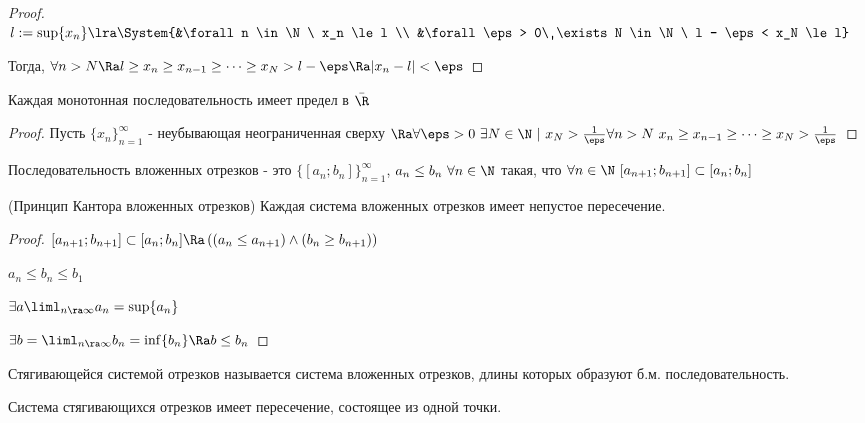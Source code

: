 \begin{proof}
	$l := \sup \{x_n\} \lra \System{&\forall n \in \N\ x_n \le l \\ &\forall \eps > 0\ \exists N \in \N\ l - \eps < x_N \le l}$
	
	Тогда, $\forall n > N \Ra l \ge x_n \ge x_{n - 1} \ge \dots \ge x_N > l - \eps \Ra |x_n - l| < \eps$
\end{proof}

\begin{addition}
	Каждая монотонная последовательность имеет предел в $\bar{\R}$
\end{addition}

\begin{proof}
	Пусть $\{x_n\}_{n = 1}^\infty$ - неубывающая неограниченная сверху $\Ra \forall \eps > 0\ \exists N \in \N\ |\ x_N > \frac{1}{\eps} \forall n > N\ x_n \ge x_{n - 1} \ge \dots \ge x_N > \frac{1}{\eps}$
\end{proof}

\begin{definition}
	Последовательность вложенных отрезков - это $\{[a_n; b_n]\}_{n = 1}^\infty$, $a_n \le b_n\ \forall n \in \N$ такая, что $\forall n \in \N\ [a_{n + 1}; b_{n + 1}] \subset [a_n; b_n]$
\end{definition}

\begin{theorem} (Принцип Кантора вложенных отрезков)
	Каждая система вложенных отрезков имеет непустое пересечение.
\end{theorem}

\begin{proof}
	$[a_{n + 1}; b_{n + 1}] \subset [a_n; b_n] \Ra \left((a_n \le a_{n + 1}) \wedge (b_n \ge b_{n + 1})\right)$
	
	$a_n \le b_n \le b_1$
	
	$\exists a \liml_{n \ra \infty} a_n = \sup \{a_n\}$
	
	$\exists b = \liml_{n \ra \infty} b_n = \inf \{b_n\} \Ra b \le b_n$
	
\end{proof}

\begin{definition}
	Стягивающейся системой отрезков называется система вложенных отрезков, длины которых образуют б.м. последовательность.
\end{definition}

\begin{addition}
	Система стягивающихся отрезков имеет пересечение, состоящее из одной точки.
\end{addition}

